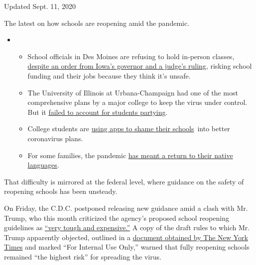 Updated Sept. 11, 2020

The latest on how schools are reopening amid the pandemic.

\begin{itemize}
\item
  \begin{itemize}
  \tightlist
  \item
    School officials in Des Moines are refusing to hold in-person
    classes,
    \href{https://www.nytimes3xbfgragh.onion/2020/09/10/us/des-moines-school-opening-coronavirus.html?action=click\&pgtype=Article\&state=default\&region=MAIN_CONTENT_3\&context=storylines_keepup}{despite
    an order from Iowa's governor and a judge's ruling}, risking school
    funding and their jobs because they think it's unsafe.
  \item
    The University of Illinois at Urbana-Champaign had one of the most
    comprehensive plans by a major college to keep the virus under
    control. But it
    \href{https://www.nytimes3xbfgragh.onion/2020/09/10/health/university-illinois-covid.html?action=click\&pgtype=Article\&state=default\&region=MAIN_CONTENT_3\&context=storylines_keepup}{failed
    to account for students partying}.
  \item
    College students are
    \href{https://www.nytimes3xbfgragh.onion/2020/09/10/technology/coronavirus-quarantines-college.html?action=click\&pgtype=Article\&state=default\&region=MAIN_CONTENT_3\&context=storylines_keepup}{using
    apps to shame their schools}~into better coronavirus plans.
  \item
    For some families, the pandemic
    \href{https://www.nytimes3xbfgragh.onion/2020/09/10/parenting/family-second-language-coronavirus.html?action=click\&pgtype=Article\&state=default\&region=MAIN_CONTENT_3\&context=storylines_keepup}{has
    meant a return to their native languages}.
  \end{itemize}
\end{itemize}

That difficulty is mirrored at the federal level, where guidance on the
safety of reopening schools has been unsteady.

On Friday, the C.D.C. postponed releasing new guidance amid a clash with
Mr. Trump, who this month criticized the agency's proposed school
reopening guidelines as
\href{https://www.nytimes3xbfgragh.onion/2020/07/08/us/politics/trump-schools-reopening.html}{``very
tough and expensive.''} A copy of the draft rules to which Mr. Trump
apparently objected, outlined in a
\href{https://www.nytimes3xbfgragh.onion/2020/07/10/us/politics/trump-schools-reopening.html}{document
obtained by The New York Times} and marked ``For Internal Use Only,''
warned that fully reopening schools remained ``the highest risk'' for
spreading the virus.

